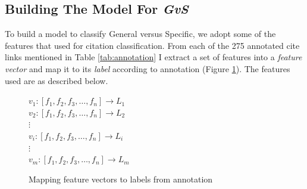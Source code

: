 \subsection*{Building The Model For {\it GvS}}
To build a model to classify General versus Specific, we adopt some of the features that \cite{dongensemble} used for citation classification. From each of the 275 annotated cite links mentioned in Table \ref{tab:annotation} I extract a set of features into a {\it feature vector} and map it to its {\it label} according to annotation (Figure \ref{fig:featurevector}). The features used are as described below.

\begin{figure}[h]
\centering
$v_1:[f_1, f_2, f_3, \ldots, f_n] \rightarrow L_1$ \\
$v_2:[f_1, f_2, f_3, \ldots, f_n] \rightarrow L_2$ \\
$\vdots$ \\
$v_i:[f_1, f_2, f_3, \ldots, f_n] \rightarrow L_i$ \\
$\vdots$ \\
$v_m:[f_1, f_2, f_3, \ldots, f_n] \rightarrow L_m$
\caption{Mapping feature vectors to labels from annotation}
\label{fig:featurevector}
\end{figure}

